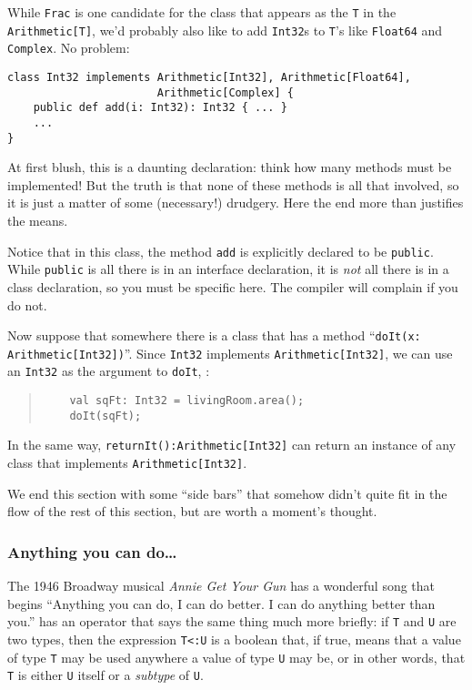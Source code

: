 While {\tt Frac} is one candidate for the class that
appears as the {\tt T} in the {\tt Arithmetic[T]}, we'd probably also like to
add {\tt Int32}s to {\tt T}'s like {\tt Float64} and {\tt Complex}.  No
problem:
\begin{verbatim}
class Int32 implements Arithmetic[Int32], Arithmetic[Float64], 
                       Arithmetic[Complex] {
    public def add(i: Int32): Int32 { ... } 
    ... 
}
\end{verbatim}

At first blush, this is a daunting declaration: think how many methods must be implemented!
But the truth is that none of these methods is all that involved, so it is just a matter of
some (necessary!) drudgery.  Here the end more than justifies the means.

Notice that in this class, the method {\tt add} is explicitly declared to be
{\tt public}.  While {\tt public} is all there is in an interface declaration,
it is {\em not} all there is in a class declaration, so you must be specific
here.  The compiler will complain if you do not.

Now suppose that somewhere there is a class that has a method ``{\tt doIt(x:
Arith\-me\-tic[Int32])}''. Since {\tt Int32} implements {\tt Arithmetic[Int32]},
we can use an {\tt Int32} as the argument to {\tt doIt}, \eg:
\begin{quote}
\begin{verbatim}
	val sqFt: Int32 = livingRoom.area();
	doIt(sqFt);
\end{verbatim}
\end{quote}
In the same way, {\tt returnIt():Arithmetic[Int32]} can return an instance of
any class that implements {\tt Arithmetic[Int32]}.


We end this section with some ``side bars'' that somehow didn't quite fit in 
the flow of the rest of this section, but are worth a moment's thought.

\subsubsection{ Anything you can do\ldots}\label{subsub:type:anything}
The 1946 Broadway musical {\em Annie Get Your
Gun} has a wonderful song that begins ``Anything you can do, I can do better. 
I can do anything better than you.''  \Xten{} has an operator that says the
same thing much more briefly: if {\tt T} and {\tt U} are two types, then the
expression {\tt T<:U} is a boolean that, if true, means that a value of type
{\tt T} may be used anywhere a value of type {\tt U} may be, or in other words,
that {\tt T} is either {\tt U} itself or a {\em subtype} of {\tt U}. 

